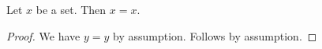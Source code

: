\begin{proposition}\label{phase5_exact_proof_local_free}
    Let $x$ be a set.
    Then $x = x$.
\end{proposition}
\begin{proof}
    We have $y = y$ by assumption.
    Follows by assumption.
\end{proof}
